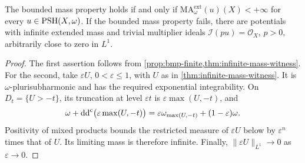 \begin{corollary}\label{cor:bmp-characterization}
The bounded mass property holds if and only if
$\mathrm{MA}^{\mathrm{ext}}_\omega(u)(X)<+\infty$ for every $u\in\mathrm{PSH}(X,\omega)$.
If the bounded mass property fails, there are potentials with infinite extended mass and trivial multiplier ideals $\mathcal I(pu)=\mathcal O_X$, $p>0$, arbitrarily close to zero in $L^1$.
\end{corollary}
\begin{proof}
The first assertion follows from \cref{prop:bmp-finite,thm:infinite-mass-witness}. For the second, take $\varepsilon U$, $0<\varepsilon\leq1$, with $U$ as in \cref{thm:infinite-mass-witness}. It is $\omega$-plurisubharmonic and has the required exponential integrability. On $D_t=\{U>-t\}$, its truncation at level $\varepsilon t$ is $\varepsilon\max(U,-t)$, and
\[
 \omega+\mathrm{dd}^{\mathrm{c}}\bigl(\varepsilon\max(U,-t)\bigr)
 =\varepsilon\omega_{\max(U,-t)}+(1-\varepsilon)\omega.
\]
Positivity of mixed products bounds the restricted measure of $\varepsilon U$ below by $\varepsilon^n$ times that of $U$. Its limiting mass is therefore infinite. Finally, $\|\varepsilon U\|_{L^1}\to0$ as $\varepsilon\to0$.
\end{proof}


